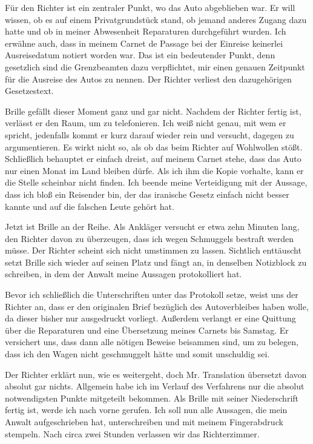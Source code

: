 Für den Richter ist ein zentraler Punkt, wo das Auto abgeblieben war. Er will wissen, ob es auf einem Privatgrundstück stand, ob jemand anderes Zugang dazu hatte und ob in meiner Abwesenheit Reparaturen durchgeführt wurden. Ich erwähne auch, dass in meinem Carnet de Passage bei der Einreise keinerlei Ausreisedatum notiert worden war. Das ist ein bedeutender Punkt, denn gesetzlich sind die Grenzbeamten dazu verpflichtet, mir einen genauen Zeitpunkt für die Ausreise des Autos zu nennen. Der Richter verliest den dazugehörigen Gesetzestext.

Brille gefällt dieser Moment ganz und gar nicht. Nachdem der Richter fertig ist, verlässt er den Raum, um zu telefonieren. Ich weiß nicht genau, mit wem er spricht, jedenfalls kommt er kurz darauf wieder rein und versucht, dagegen zu argumentieren. Es wirkt nicht so, als ob das beim Richter auf Wohlwollen stößt. Schließlich behauptet er einfach dreist, auf meinem Carnet stehe, dass das Auto nur einen Monat im Land bleiben dürfe. Als ich ihm die Kopie vorhalte, kann er die Stelle scheinbar nicht finden. Ich beende meine Verteidigung mit der Aussage, dass ich bloß ein Reisender bin, der das iranische Gesetz einfach nicht besser kannte und auf die falschen Leute gehört hat.

Jetzt ist Brille an der Reihe. Als Ankläger versucht er etwa zehn Minuten lang, den Richter davon zu überzeugen, dass ich wegen Schmuggels bestraft werden müsse. Der Richter scheint sich nicht umstimmen zu lassen. Sichtlich enttäuscht setzt Brille sich wieder auf seinen Platz und fängt an, in denselben Notizblock zu schreiben, in dem der Anwalt meine Aussagen protokolliert hat.

Bevor ich schließlich die Unterschriften unter das Protokoll setze, weist uns der Richter an, dass er den originalen Brief bezüglich des Autoverbleibes haben wolle, da dieser bisher nur ausgedruckt vorliegt. Außerdem verlangt er eine Quittung über die Reparaturen und eine Übersetzung meines Carnets bis Samstag. Er versichert uns, dass dann alle nötigen Beweise beisammen sind, um zu belegen, dass ich den Wagen nicht geschmuggelt hätte und somit unschuldig sei.

Der Richter erklärt nun, wie es weitergeht, doch Mr. Translation übersetzt davon absolut gar nichts. Allgemein habe ich im Verlauf des Verfahrens nur die absolut notwendigsten Punkte mitgeteilt bekommen. Als Brille mit seiner Niederschrift fertig ist, werde ich nach vorne gerufen. Ich soll nun alle Aussagen, die mein Anwalt aufgeschrieben hat, unterschreiben und mit meinem Fingerabdruck stempeln. Nach circa zwei Stunden verlassen wir das Richterzimmer.

